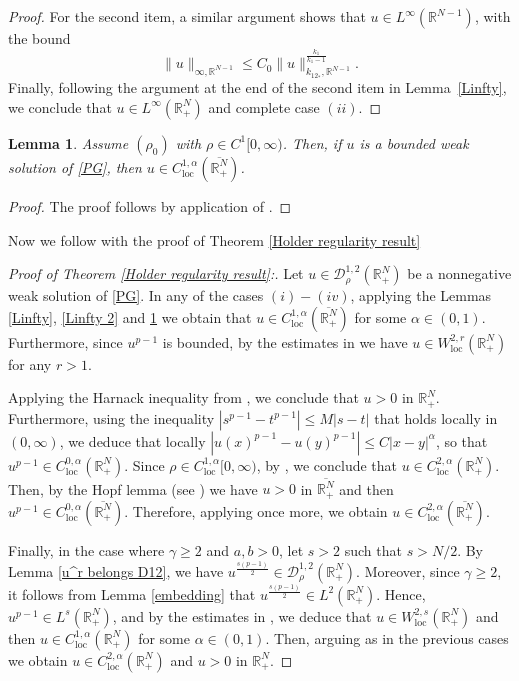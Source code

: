\documentclass[12pt,reqno]{amsart}
\newtheorem{lemma}[theorem]{Lemma}
\begin{document}
\begin{proof}
For the second item, a similar argument shows that $u \in L^\infty(\mathds{R}^{N-1})$, with the bound
\begin{equation*}
\|u\|_{\infty,\mathds{R}^{N-1}}\leq C_0 \|u\|_{k_12_\ast,\mathds{R}^{N-1}}^{\frac{k_1}{k_1-1}}.
\end{equation*}
Finally, following the argument at the end of the second item in Lemma~\ref{Linfty}, we conclude that $u\in L^\infty(\mathds{R}^N_+)$ and complete case $(ii)$. 
\end{proof}

\begin{lemma}\label{Lib} Assume $(\rho_0)$ with $\rho\in C^1[0,\infty)$. Then, if $u$ is a bounded weak solution of \eqref{PG}, then $u \in C^{1,\alpha}_{\mathrm{loc}}(\overline{\mathds{R}^N_+})$.
 \end{lemma}
 \begin{proof} The proof follows by application of \cite[Theorem 2]{Lieberman}.
\end{proof}

Now we follow with the proof of Theorem \ref{Holder regularity result}

\begin{proof}[Proof of Theorem \ref{Holder regularity result}:] Let $u \in \mathcal{D}^{1,2}_\rho(\mathds{R}^N_+)$ be a nonnegative weak solution of \eqref{PG}. In any of the cases $(i)-(iv)$, applying the Lemmas \ref{Linfty}, \ref{Linfty 2} and \ref{Lib} we obtain that $u \in C^{1,\alpha}_{\mathrm{loc}}(\overline{\mathds{R}^N_+})$ for some $\alpha\in (0,1)$. Furthermore, since $u^{p-1}$ is bounded, by the estimates in \cite{ADN 1} we have $u \in W^{2,r}_{\mathrm{loc}}(\mathds{R}^N_+)$ for any $r>1$.

Applying the Harnack inequality from \cite[Theorem 1.1]{Trudinger}, we conclude that $u>0$ in $\mathds{R}^N_+$. Furthermore, using the inequality $|s^{p-1}-t^{p-1}|\leq M|s-t|$ that holds locally in $(0,\infty)$, we deduce that locally $|u(x)^{p-1}-u(y)^{p-1}|\leq C|x-y|^\alpha$, so that $u^{p-1}\in C^{0,\alpha}_{\mathrm{loc}}(\mathds{R}^N_+)$. Since $\rho\in C^{1,\alpha}_{\mathrm{loc}}[0,\infty)$, by \cite[Theorem 9.19]{GT}, we conclude that $u \in C^{2,\alpha}_{\mathrm{loc}} (\mathds{R}^N_+)$. Then, by the Hopf lemma (see \cite[Lemma 3.4]{GT}) we have $u > 0$ in $\overline{\mathds{R}^N_+}$ and then $u^{p-1} \in C^{0,\alpha}_{\mathrm{loc}}(\overline{\mathds{R}^N_+})$. Therefore, applying \cite[Theorem 9.19]{GT} once more, we obtain $u \in C^{2,\alpha}_{\mathrm{loc}}(\overline{\mathds{R}^N_+})$.

Finally, in the case where $\gamma\geq 2$ and $a,b>0$, let $s>2$ such that $s>N/2$. By Lemma \ref{u^r belongs D12}, we have $u^{\frac{s(p-1)}{2}}\in \mathcal{D}^{1,2}_\rho(\mathds{R}^N_+)$. Moreover, since $\gamma\geq 2$, it follows from Lemma \ref{embedding} that $u^{\frac{s(p-1)}{2}}\in L^2(\mathds{R}^N_+)$. Hence, $u^{p-1}\in L^s(\mathds{R}^N_+)$, and by the estimates in \cite{ADN 1}, we deduce that $u \in W^{2,s}_{\mathrm{loc}}(\mathds{R}^N_+)$ and then $u\in C^{1,\alpha}_{\mathrm{loc}} (\mathds{R}^N_+)$ for some $\alpha\in(0,1)$. Then, arguing as in the previous cases we obtain $u \in C^{2,\alpha}_{\mathrm{loc}} (\mathds{R}^N_+)$ and $u>0$ in $\mathds{R}^N_+$.
\end{proof}
\end{document}
